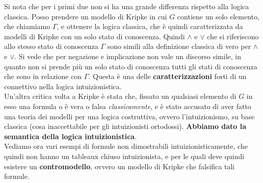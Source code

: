 \documentclass[a4paper,12pt, oneside]{book}
\begin{document}
Si nota che per i primi due non si ha una grande differenza rispetto alla logica
classica. Posso prendere un modello di Kripke in cui $G$ contiene un solo
elemento, che chiamiamo $\Gamma$, e ottenere la logica classica, che è quindi
caratterizzata da modelli di Kripke con un solo stato di conoscenza. Quindi
$\land$ e $\lor$ che si riferiscono allo stesso stato di conoscenza $\Gamma$
sono simili alla definizione classica di vero per $\land$ e $\lor$. Si vede che
per negazione e implicazione non vale un discorso simile, in quanto non si
prende più un solo stato di conoscenza tutti gli stati di conoscenza che sono in
relazione con $\Gamma$. Questa è una delle \textbf{caratterizzazioni} forti di
un connettivo nella logica intuizionistica.\\
Un'altra critica volta a Kripke è stata che, fissato un qualsiasi elemento di
$G$ in esso una formula o è vera o falsa \textit{classicamente}, e è stato
accusato di aver fatto una teoria dei modelli per una logica costruttiva, ovvero
l'intuizionismo, su base classica (cosa inaccettabile per gli intuizionisti
ortodossi). 
\textbf{Abbiamo dato la semantica della logica intuizionistica}.\\
Vediamo ora vari esempi di formule non dimostrabili intuizionisticamente, che
quindi non hanno un tableaux chiuso intuizionista, e per le quali deve quindi
esistere un \textbf{contromodello}, ovvero un modello di Kripke che falsifica
tali formule.
\end{document}
